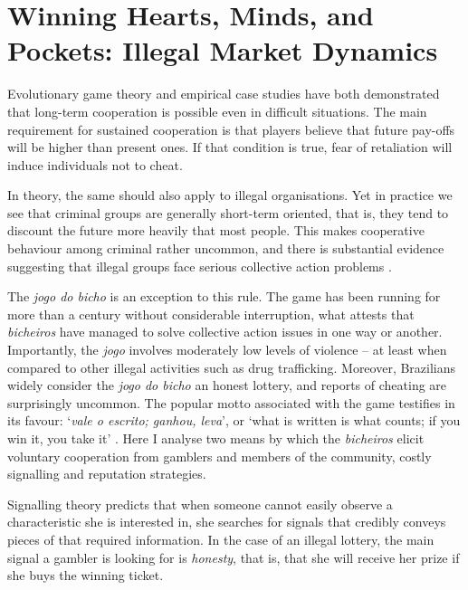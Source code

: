 \documentclass[a4paper,12pt]{article}
\begin{document}
\section{Winning Hearts, Minds, and Pockets: Illegal Market Dynamics}%
\label{sub:pockets}

Evolutionary game theory \citep{axelrod1984evolution, axelrod1985achieving, smith1982evolution} and empirical case studies \citep{isaac1984divergent, ostrom1990governing} have both demonstrated that long-term cooperation is possible even in difficult situations. The main requirement for sustained cooperation is that players believe that future pay-offs will be higher than present ones. If that condition is true, fear of retaliation will induce individuals not to cheat. 

In theory, the same should also apply to illegal organisations. Yet in practice we see that criminal groups are generally short-term oriented, that is, they tend to discount the future more heavily that most people. This makes cooperative behaviour among criminal rather uncommon, and there is substantial evidence suggesting that illegal groups face serious collective action problems \citep[e.g.,][]{gambetta2009codes, leeson2010pirational, skarbek2011governance, skarbek2012prison, varese2001russian}. 

The \textit{jogo do bicho} is an exception to this rule. The game has been running for more than a century without considerable interruption, what attests that \textit{bicheiros} have managed to solve collective action issues in one way or another. Importantly, the \textit{jogo} involves moderately low levels of violence -- at least when compared to other illegal activities such as drug trafficking. Moreover, Brazilians widely consider the \textit{jogo do bicho} an honest lottery, and reports of cheating are surprisingly uncommon. The popular motto associated with the game testifies in its favour: `\textit{vale o escrito; ganhou, leva}', or `what is written is what counts; if you win it, you take it' \citep{magalhaes2005ganhou}. Here I analyse two means by which the \textit{bicheiros} elicit voluntary cooperation from gamblers and members of the community, costly signalling and reputation strategies. 

Signalling theory predicts that when someone cannot easily observe a characteristic she is interested in, she searches for signals that credibly conveys pieces of that required information. In the case of an illegal lottery, the main signal a gambler is looking for is \textit{honesty}, that is, that she will receive her prize if she buys the winning ticket. 
\end{document}
